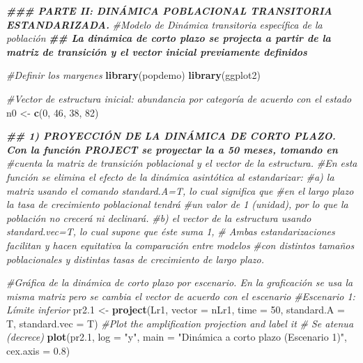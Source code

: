 \documentclass[
]{book}
\newenvironment{Shaded}{\begin{snugshade}}{\end{snugshade}}
\newcommand{\AttributeTok}[1]{\textcolor[rgb]{0.13,0.29,0.53}{#1}}
\newcommand{\CommentTok}[1]{\textcolor[rgb]{0.56,0.35,0.01}{\textit{#1}}}
\newcommand{\DecValTok}[1]{\textcolor[rgb]{0.00,0.00,0.81}{#1}}
\newcommand{\DocumentationTok}[1]{\textcolor[rgb]{0.56,0.35,0.01}{\textbf{\textit{#1}}}}
\newcommand{\FloatTok}[1]{\textcolor[rgb]{0.00,0.00,0.81}{#1}}
\newcommand{\FunctionTok}[1]{\textcolor[rgb]{0.13,0.29,0.53}{\textbf{#1}}}
\newcommand{\NormalTok}[1]{#1}
\newcommand{\OtherTok}[1]{\textcolor[rgb]{0.56,0.35,0.01}{#1}}
\newcommand{\StringTok}[1]{\textcolor[rgb]{0.31,0.60,0.02}{#1}}
\theoremstyle{definition}
\theoremstyle{definition}
\theoremstyle{definition}
\theoremstyle{definition}
\theoremstyle{remark}
\begin{document}
\begin{Shaded}
\begin{Highlighting}[]
\DocumentationTok{\#\#\# PARTE II: DINÁMICA POBLACIONAL TRANSITORIA ESTANDARIZADA.}
\CommentTok{\#Modelo de Dinámica transitoria específica de la población  }
\DocumentationTok{\#\# La dinámica de corto plazo se projecta a partir de la matriz de transición y el vector inicial previamente definidos}

\CommentTok{\#Definir los margenes}
\FunctionTok{library}\NormalTok{(popdemo)}
\FunctionTok{library}\NormalTok{(ggplot2)}

\CommentTok{\#Vector de estructura inicial: abundancia por categoría de acuerdo con  el estado }
\NormalTok{n0 }\OtherTok{\textless{}{-}} \FunctionTok{c}\NormalTok{(}\DecValTok{0}\NormalTok{, }\DecValTok{46}\NormalTok{, }\DecValTok{38}\NormalTok{, }\DecValTok{82}\NormalTok{) }

\DocumentationTok{\#\# 1) PROYECCIÓN DE LA DINÁMICA DE CORTO PLAZO. Con la función PROJECT se proyectar la  a 50 meses, tomando en }
\CommentTok{\#cuenta la matriz de transición poblacional y el vector de la estructura.}
\CommentTok{\#En esta función se elimina el efecto de la dinámica asintótica al estandarizar: }
\CommentTok{\#a) la matriz usando el comando \textquotesingle{}standard.A=T\textquotesingle{}, lo cual significa que }
\CommentTok{\#en el largo plazo la tasa de crecimiento poblacional tendrá }
\CommentTok{\#un valor de 1 (unidad), por lo que la población no crecerá ni declinará. }
\CommentTok{\#b) el vector de la estructura usando \textquotesingle{}standard.vec=T\textquotesingle{}, lo cual supone que éste suma 1, }
\CommentTok{\# Ambas estandarizaciones facilitan y hacen equitativa la comparación entre modelos }
\CommentTok{\#con distintos tamaños poblacionales y distintas tasas de crecimiento de largo plazo. }

\CommentTok{\#Gráfica de la dinámica de corto plazo por escenario. En la graficación se usa la misma matriz pero se cambia el vector de acuerdo con el escenario}
\CommentTok{\#Escenario 1: Límite inferior}
\NormalTok{pr2}\FloatTok{.1} \OtherTok{\textless{}{-}} \FunctionTok{project}\NormalTok{(Lr1, }\AttributeTok{vector =}\NormalTok{ nLr1, }\AttributeTok{time =} \DecValTok{50}\NormalTok{, }
                 \AttributeTok{standard.A =}\NormalTok{ T, }\AttributeTok{standard.vec =}\NormalTok{ T)}
\CommentTok{\#Plot the amplification projection and label it}
\CommentTok{\# Se atenua (decrece)}
\FunctionTok{plot}\NormalTok{(pr2}\FloatTok{.1}\NormalTok{, }\AttributeTok{log =} \StringTok{"y"}\NormalTok{, }\AttributeTok{main =} \StringTok{"Dinámica a corto plazo (Escenario 1)"}\NormalTok{, }\AttributeTok{cex.axis =} \FloatTok{0.8}\NormalTok{)}
\end{Highlighting}
\end{Shaded}
\end{document}
